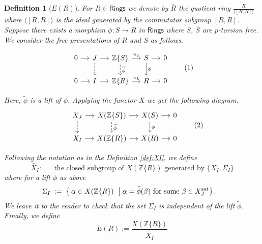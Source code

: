 \documentclass[10pt,a4paper]{amsart}
\newtheorem{definition}{Definition}
\newcommand{\Rings}{{\mathsf{Rings}}}
\newcommand{\Z}{{\mathbb Z}}
\newcommand{\ab}[1]{\langle {#1} \rangle}
\renewcommand{\tilde}{\widetilde}
\begin{document}
\begin{definition}[$E(R)$]\label{def:e}
For $R \in \Rings$ we denote by $\bar{R}$ the quotient ring $\frac{R}{\ab{[R,R]}}$ where $\ab{[R,R]}$ is the ideal generated by the commutator subgroup $[R,R]$. Suppose there exists a morphism $\phi: S \to R$ in $\Rings$ where $S$, $\bar{S}$ are $p$-torsion free. We consider the free presentations of $R$ and $S$ as follows. 

\[
\begin{tikzcd}[column sep=small, row sep=1.5em]
0 \arrow[r] & J \arrow[d, dashed] \arrow[r] & \Z\{S\} \arrow[d, dashed,"\tilde{\phi}"] \arrow[r, "\pi_2"] & S \arrow[d, "\phi"] \arrow[r] & 0 \\
0 \arrow[r] & I \arrow[r] & \Z\{R\} \arrow[r, "\pi_1"] & R \arrow[r] & 0
\end{tikzcd}
\tag{1}
\] 

Here, $\tilde{\phi}$ is a lift of $\phi$. Applying the functor $X$ we get the following diagram.
\[
\begin{tikzcd}[column sep=small, row sep=1.5em]
 & X_J \arrow[d, dashed] \arrow[r] & X(\Z\{S\}) \arrow[d, dashed,"\tilde{\phi}"] \arrow[r] & X(S) \arrow[d, "\phi"] \arrow[r] & 0 \\
 & X_I \arrow[r] & X(\Z\{R\}) \arrow[r] & X(R) \arrow[r] & 0
\end{tikzcd}
\tag{2}
\] 

Following the notation as in the Definition \ref{def:XI}, we define 
$$\tilde{X_I} : = \text{ the closed subgroup of } X(\Z\{R\}) \text{ generated by  } \{X_I, \Sigma_I\}$$
where for a lift $\tilde{\phi}$ as above
\[
\begin{aligned}
\Sigma_I \;:=\; \bigl\{\, \alpha \in X(\Z\{R\}) \ \bigm|\;
&  \alpha = \tilde{\phi}(\beta) \text{ for some } \beta \in X_J^{\mathrm{sat}}
\bigr\}.
\end{aligned}
\]
We leave it to the reader to check that the set $\Sigma_I$ is independent of the lift $\tilde{\phi}$.
Finally, we define $$E(R):= \frac{X(\Z\{R\})}{\tilde{X_I}}$$ 
\end{definition}
\end{document}
